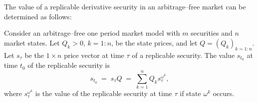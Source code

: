 The value of a replicable derivative security in an arbitrage--free market
can be determined as follows:

\begin{lemma}
Consider an arbitrage--free one period market model with $m$ securities and
$n$ market states. Let $Q_k > 0$, $k = 1:n$, be the state prices, and let $Q
= (Q_k)_{k=1:n}$. Let $s_\tau$ be the $1 \times n$ price vector at time
$\tau$ of a replicable security. The value $s_{t_0}$ at time $t_0$ of the
replicable security is
\begin{equation}
s_{t_0} \;=\; s_\tau Q \;=\; \sum_{k=1}^n Q_k s_\tau^{\omega^k},
\end{equation}
where $s_\tau^{\omega^k}$ is the value of the replicable security at time
$\tau$ if state $\omega^k$ occurs.
\end{lemma}

